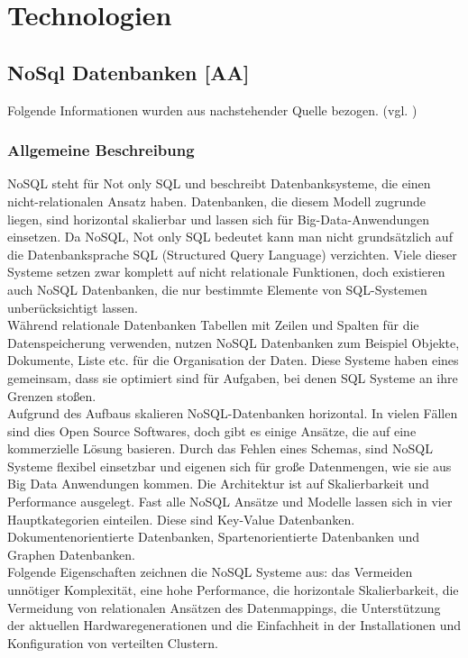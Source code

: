 \section{Technologien}

\newpage
\subsection{NoSql Datenbanken [AA]}
Folgende Informationen wurden aus nachstehender Quelle bezogen. (vgl. \cite{bigdata_nosql_2020})
\subsubsection{Allgemeine Beschreibung}
NoSQL steht für Not only SQL und beschreibt Datenbanksysteme, die einen nicht-relationalen Ansatz haben. Datenbanken, die diesem Modell zugrunde liegen, sind horizontal skalierbar und lassen sich für Big-Data-Anwendungen einsetzen. Da NoSQL, Not only SQL bedeutet kann man nicht grundsätzlich auf die Datenbanksprache SQL (Structured Query Language) verzichten. Viele dieser Systeme setzen zwar komplett auf nicht relationale Funktionen, doch existieren auch NoSQL Datenbanken, die nur bestimmte Elemente von SQL-Systemen unberücksichtigt lassen.\\

Während relationale Datenbanken Tabellen mit Zeilen und Spalten für die Datenspeicherung verwenden, nutzen NoSQL Datenbanken zum Beispiel Objekte, Dokumente, Liste etc. für die Organisation der Daten. Diese Systeme haben eines gemeinsam, dass sie optimiert sind für Aufgaben, bei denen SQL Systeme an ihre Grenzen stoßen.\\

Aufgrund des Aufbaus skalieren NoSQL-Datenbanken horizontal. In vielen Fällen sind dies Open Source Softwares, doch gibt es einige Ansätze, die auf eine kommerzielle Lösung basieren. Durch das Fehlen eines Schemas, sind NoSQL Systeme flexibel einsetzbar und eigenen sich für große Datenmengen, wie sie aus Big Data Anwendungen kommen. Die Architektur ist auf Skalierbarkeit und Performance ausgelegt. Fast alle NoSQL Ansätze und Modelle lassen sich in vier Hauptkategorien einteilen. Diese sind Key-Value Datenbanken. Dokumentenorientierte Datenbanken, Spartenorientierte Datenbanken und Graphen Datenbanken.\\

Folgende Eigenschaften zeichnen die NoSQL Systeme aus: das Vermeiden unnötiger Komplexität, eine hohe Performance, die horizontale Skalierbarkeit, die Vermeidung von relationalen Ansätzen des Datenmappings, die Unterstützung der aktuellen Hardwaregenerationen und die Einfachheit in der Installationen und Konfiguration von verteilten Clustern.
\newpage
